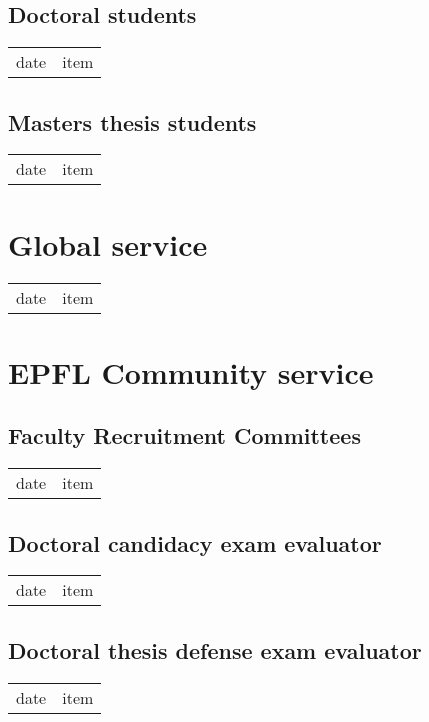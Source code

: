 \subsection{Doctoral students}
\begin{tabular}[l]{ p{} p{} }
date & item\\
\end{tabular} 

\subsection{Masters thesis students}
\begin{tabular}[l]{ p{} p{} }
date & item\\
\end{tabular}
	
\section{Global service}
\begin{tabular}[l]{ p{} p{} }
date & item\\
\end{tabular} 

\section{EPFL Community service}

\subsection{Faculty Recruitment Committees}
\begin{tabular}[l]{ p{} p{} }
date & item\\
\end{tabular} 


\subsection{Doctoral candidacy exam evaluator}
\begin{tabular}[l]{ p{} p{} }
date & item\\
\end{tabular} 

\subsection{Doctoral thesis defense exam evaluator}
\begin{tabular}[l]{ p{} p{} }
date & item\\
\end{tabular} 

